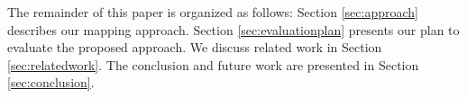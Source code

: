 %

%

%






%



	

The remainder of this paper is organized as follows: Section \ref{sec:approach} describes our mapping approach. 
Section \ref{sec:evaluationplan} presents our plan to evaluate the proposed approach. 
We discuss related work in Section \ref{sec:relatedwork}. 
The conclusion and future work are presented in Section \ref{sec:conclusion}.

